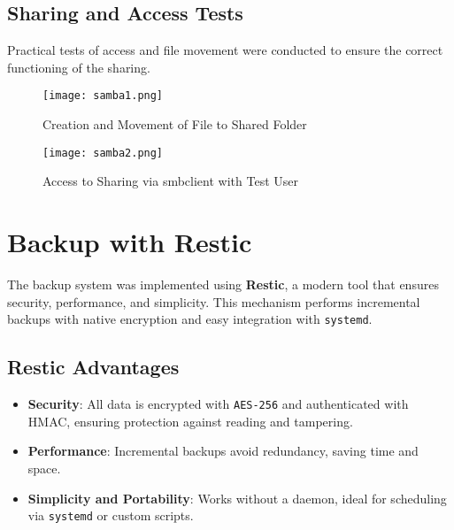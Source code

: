 \documentclass[12pt]{report}
\begin{document}
\subsection*{Sharing and Access Tests}

Practical tests of access and file movement were conducted to ensure the correct functioning of the sharing.

\begin{figure}[h]
    \centering
    \texttt{[image: samba1.png]}
    \caption{Creation and Movement of File to Shared Folder}
    \label{fig:samba-creation}
\end{figure}

\begin{figure}[h]
    \centering
    \texttt{[image: samba2.png]}
    \caption{Access to Sharing via smbclient with Test User}
    \label{fig:samba-access}
\end{figure}

\clearpage

\section*{Backup with Restic}

The backup system was implemented using \textbf{Restic}, a modern tool that ensures security, performance, and simplicity. This mechanism performs incremental backups with native encryption and easy integration with \texttt{systemd}.

\subsection*{Restic Advantages}

\begin{itemize}
    \item \textbf{Security}: All data is encrypted with \texttt{AES-256} and authenticated with HMAC, ensuring protection against reading and tampering.
    \item \textbf{Performance}: Incremental backups avoid redundancy, saving time and space.
    \item \textbf{Simplicity and Portability}: Works without a daemon, ideal for scheduling via \texttt{systemd} or custom scripts.
\end{itemize}
\end{document}
